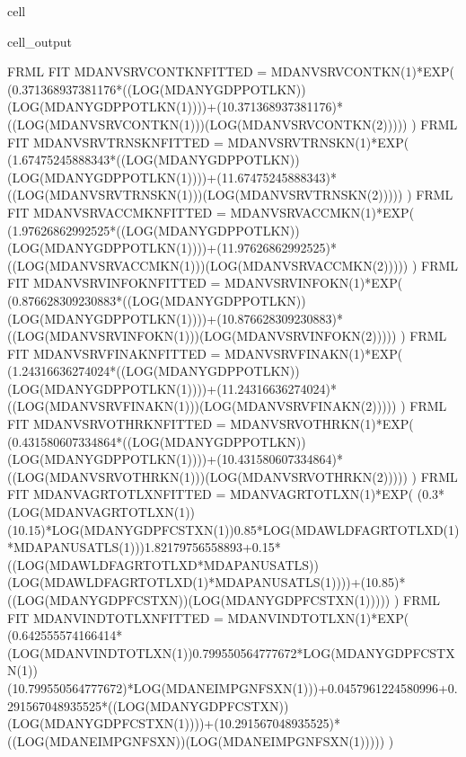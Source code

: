 \documentclass[letterpaper,10pt,english]{jupyterBook}
\begin{document}
\begin{sphinxuseclass}{cell}
\begin{sphinxVerbatimOutput}
\begin{sphinxuseclass}{cell_output}
\begin{sphinxVerbatim}[commandchars=\\\{\}]
FRML \PYGZlt{}FIT\PYGZgt{} MDANVSRVCONTKN\PYGZus{}FITTED = MDANVSRVCONTKN(\PYGZhy{}1)*EXP( (0.371368937381176*((LOG(MDANYGDPPOTLKN))\PYGZhy{}(LOG(MDANYGDPPOTLKN(\PYGZhy{}1))))+(1\PYGZhy{}0.371368937381176)*((LOG(MDANVSRVCONTKN(\PYGZhy{}1)))\PYGZhy{}(LOG(MDANVSRVCONTKN(\PYGZhy{}2))))) ) \PYGZdl{}
FRML \PYGZlt{}FIT\PYGZgt{} MDANVSRVTRNSKN\PYGZus{}FITTED = MDANVSRVTRNSKN(\PYGZhy{}1)*EXP( (1.67475245888343*((LOG(MDANYGDPPOTLKN))\PYGZhy{}(LOG(MDANYGDPPOTLKN(\PYGZhy{}1))))+(1\PYGZhy{}1.67475245888343)*((LOG(MDANVSRVTRNSKN(\PYGZhy{}1)))\PYGZhy{}(LOG(MDANVSRVTRNSKN(\PYGZhy{}2))))) ) \PYGZdl{}
FRML \PYGZlt{}FIT\PYGZgt{} MDANVSRVACCMKN\PYGZus{}FITTED = MDANVSRVACCMKN(\PYGZhy{}1)*EXP( (1.97626862992525*((LOG(MDANYGDPPOTLKN))\PYGZhy{}(LOG(MDANYGDPPOTLKN(\PYGZhy{}1))))+(1\PYGZhy{}1.97626862992525)*((LOG(MDANVSRVACCMKN(\PYGZhy{}1)))\PYGZhy{}(LOG(MDANVSRVACCMKN(\PYGZhy{}2))))) ) \PYGZdl{}
FRML \PYGZlt{}FIT\PYGZgt{} MDANVSRVINFOKN\PYGZus{}FITTED = MDANVSRVINFOKN(\PYGZhy{}1)*EXP( (0.876628309230883*((LOG(MDANYGDPPOTLKN))\PYGZhy{}(LOG(MDANYGDPPOTLKN(\PYGZhy{}1))))+(1\PYGZhy{}0.876628309230883)*((LOG(MDANVSRVINFOKN(\PYGZhy{}1)))\PYGZhy{}(LOG(MDANVSRVINFOKN(\PYGZhy{}2))))) ) \PYGZdl{}
FRML \PYGZlt{}FIT\PYGZgt{} MDANVSRVFINAKN\PYGZus{}FITTED = MDANVSRVFINAKN(\PYGZhy{}1)*EXP( (1.24316636274024*((LOG(MDANYGDPPOTLKN))\PYGZhy{}(LOG(MDANYGDPPOTLKN(\PYGZhy{}1))))+(1\PYGZhy{}1.24316636274024)*((LOG(MDANVSRVFINAKN(\PYGZhy{}1)))\PYGZhy{}(LOG(MDANVSRVFINAKN(\PYGZhy{}2))))) ) \PYGZdl{}
FRML \PYGZlt{}FIT\PYGZgt{} MDANVSRVOTHRKN\PYGZus{}FITTED = MDANVSRVOTHRKN(\PYGZhy{}1)*EXP( (0.431580607334864*((LOG(MDANYGDPPOTLKN))\PYGZhy{}(LOG(MDANYGDPPOTLKN(\PYGZhy{}1))))+(1\PYGZhy{}0.431580607334864)*((LOG(MDANVSRVOTHRKN(\PYGZhy{}1)))\PYGZhy{}(LOG(MDANVSRVOTHRKN(\PYGZhy{}2))))) ) \PYGZdl{}
FRML \PYGZlt{}FIT\PYGZgt{} MDANVAGRTOTLXN\PYGZus{}FITTED = MDANVAGRTOTLXN(\PYGZhy{}1)*EXP( (\PYGZhy{}0.3*(LOG(MDANVAGRTOTLXN(\PYGZhy{}1))\PYGZhy{}(1\PYGZhy{}0.15)*LOG(MDANYGDPFCSTXN(\PYGZhy{}1))\PYGZhy{}0.85*LOG(MDAWLDFAGRTOTLXD(\PYGZhy{}1)*MDAPANUSATLS(\PYGZhy{}1)))\PYGZhy{}1.82179756558893+0.15*((LOG(MDAWLDFAGRTOTLXD*MDAPANUSATLS))\PYGZhy{}(LOG(MDAWLDFAGRTOTLXD(\PYGZhy{}1)*MDAPANUSATLS(\PYGZhy{}1))))+(1\PYGZhy{}0.85)*((LOG(MDANYGDPFCSTXN))\PYGZhy{}(LOG(MDANYGDPFCSTXN(\PYGZhy{}1))))) ) \PYGZdl{}
FRML \PYGZlt{}FIT\PYGZgt{} MDANVINDTOTLXN\PYGZus{}FITTED = MDANVINDTOTLXN(\PYGZhy{}1)*EXP( (\PYGZhy{}0.642555574166414*(LOG(MDANVINDTOTLXN(\PYGZhy{}1))\PYGZhy{}0.799550564777672*LOG(MDANYGDPFCSTXN(\PYGZhy{}1))\PYGZhy{}(1\PYGZhy{}0.799550564777672)*LOG(MDANEIMPGNFSXN(\PYGZhy{}1)))+0.0457961224580996+0.291567048935525*((LOG(MDANYGDPFCSTXN))\PYGZhy{}(LOG(MDANYGDPFCSTXN(\PYGZhy{}1))))+(1\PYGZhy{}0.291567048935525)*((LOG(MDANEIMPGNFSXN))\PYGZhy{}(LOG(MDANEIMPGNFSXN(\PYGZhy{}1))))) ) \PYGZdl{}

\end{sphinxVerbatim}
\end{sphinxuseclass}
\end{sphinxVerbatimOutput}
\end{sphinxuseclass}
\end{document}
